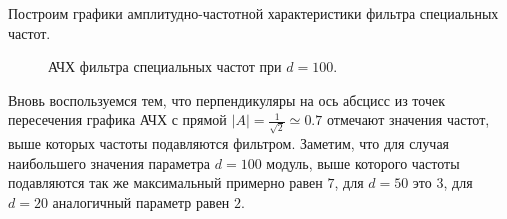 \documentclass[a5paper, 10pt]{article}
\theoremstyle{definition}
\theoremstyle{plain}
\theoremstyle{remark}
\begin{document}
\newpage
Построим графики амплитудно-частотной характеристики фильтра специальных частот.

\begin{figure}[h!]
\caption{АЧХ фильтра специальных частот при $d=100$.}
\end{figure}

Вновь воспользуемся тем, что перпендикуляры на ось абсцисс из точек пересечения графика АЧХ с прямой $|A| = \frac{1}{\sqrt{2}} \simeq 0.7$ отмечают значения частот, выше которых частоты подавляются фильтром. Заметим, что для случая наибольшего значения параметра $d=100$ модуль, выше которого частоты подавляются так же максимальный примерно равен $7$, для $d=50$ это $3$, для $d=20$ аналогичный параметр равен $2$.
\end{document}
